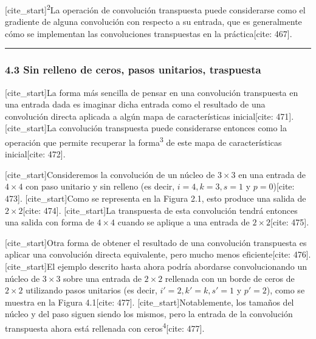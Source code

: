 \documentclass[
  super,
  preprint,
  3p]{elsarticle}
\begin{document}
{[}cite\_start{]}\textsuperscript{2}La operación de convolución
transpuesta puede considerarse como el gradiente de alguna convolución
con respecto a su entrada, que es generalmente cómo se implementan las
convoluciones transpuestas en la práctica{[}cite: 467{]}.

\begin{center}\rule{0.5\linewidth}{0.5pt}\end{center}

\subsubsection{4.3 Sin relleno de ceros, pasos unitarios,
traspuesta}\label{sin-relleno-de-ceros-pasos-unitarios-traspuesta}

{[}cite\_start{]}La forma más sencilla de pensar en una convolución
transpuesta en una entrada dada es imaginar dicha entrada como el
resultado de una convolución directa aplicada a algún mapa de
características inicial{[}cite: 471{]}. {[}cite\_start{]}La convolución
transpuesta puede considerarse entonces como la operación que permite
recuperar la forma\textsuperscript{3} de este mapa de características
inicial{[}cite: 472{]}.

{[}cite\_start{]}Consideremos la convolución de un núcleo de
\(3 \times 3\) en una entrada de \(4 \times 4\) con paso unitario y sin
relleno (es decir, \(i = 4, k = 3, s = 1\) y \(p = 0\)){[}cite: 473{]}.
{[}cite\_start{]}Como se representa en la Figura 2.1, esto produce una
salida de \(2 \times 2\){[}cite: 474{]}. {[}cite\_start{]}La transpuesta
de esta convolución tendrá entonces una salida con forma de
\(4 \times 4\) cuando se aplique a una entrada de \(2 \times 2\){[}cite:
475{]}.

{[}cite\_start{]}Otra forma de obtener el resultado de una convolución
transpuesta es aplicar una convolución directa equivalente, pero mucho
menos eficiente{[}cite: 476{]}. {[}cite\_start{]}El ejemplo descrito
hasta ahora podría abordarse convolucionando un núcleo de \(3 \times 3\)
sobre una entrada de \(2 \times 2\) rellenada con un borde de ceros de
\(2 \times 2\) utilizando pasos unitarios (es decir,
\(i' = 2, k' = k, s' = 1\) y \(p' = 2\)), como se muestra en la Figura
4.1{[}cite: 477{]}. {[}cite\_start{]}Notablemente, los tamaños del
núcleo y del paso siguen siendo los mismos, pero la entrada de la
convolución transpuesta ahora está rellenada con
ceros\textsuperscript{4}{[}cite: 477{]}.
\end{document}
